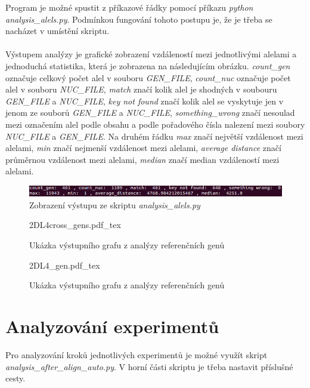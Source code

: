 \documentclass[czech,DP]{thesiskiv}
\numberwithin{equation}{section}
\begin{document}
\noindent
Program je možné spustit z příkazové řádky pomocí příkazu \textit {python analysis\_alels.py}. Podmínkou fungování tohoto postupu je, že je třeba se nacházet v umístění skriptu. 
\\
\\
\noindent
Výstupem analýzy je grafické zobrazení vzdáleností mezi jednotlivými alelami a jednoduchá statistika, která je zobrazena na následujícím obrázku. \textit{count\_gen} označuje celkový počet alel v souboru \textit{GEN\_FILE}, \textit{count\_nuc} označuje počet alel v souboru \textit{NUC\_FILE}, \textit{match} značí kolik alel je shodných v soubouru \textit{GEN\_FILE} a \textit{NUC\_FILE}, \textit{key not found} značí kolik alel se vyskytuje jen v jenom ze souborů \textit{GEN\_FILE} a \textit{NUC\_FILE}, \textit{something\_wrong} značí nesoulad mezi označením alel podle obsahu a podle pořadového čísla nalezení mezi soubory \textit{NUC\_FILE} a \textit{GEN\_FILE}. Na druhém řádku \textit{max} značí největší vzdálenost mezi alelami, \textit{min} značí nejmenší vzdálenost mezi alelami, \textit{average distance} značí průměrnou vzdálenost mezi alelami, \textit{median} značí median vzdáleností mezi alelami.

\begin{figure}[H]		
		\centering
		\includegraphics[width=\textwidth]{./img/vystup_analyzy_refrence.png}
		\caption{Zobrazení výstupu ze skriptu \textit{analysis\_alels.py} }
		\label{fig:alels_distance_skript}
\end{figure}

\begin{figure}[H]
    \centering
    \def\svgwidth{\columnwidth}
    {2DL4cross_gens.pdf_tex} 
    \caption{Ukázka výstupního grafu z analýzy referenčních genů}
\end{figure}

\begin{figure}[H]
    \centering
    \def\svgwidth{\columnwidth}
    {2DL4_gen.pdf_tex} 
    \caption{Ukázka výstupního grafu z analýzy referenčních genů}
\end{figure}


\section{Analyzování experimentů}
Pro analyzování kroků jednotlivých experimentů je možné využít skript \textit{analysis\_after\_align\_auto.py}. V horní části skriptu je třeba nastavit příslušné cesty. 
\end{document}
